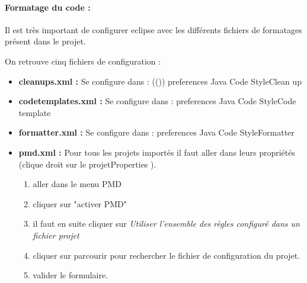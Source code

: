 \paragraph{Formatage du code :}
Il est très important de configurer eclipse avec les différents fichiers de formatages
présent dans le projet. 

On retrouve cinq fichiers de configuration :
\begin{itemize}
	\item  \textbf{cleanups.xml :}  Se configure dans : ((\leftArrow{}))
				  preferences \rightArrow{} Java \rightArrow{}Code Style\rightArrow{}Clean up

	\item \textbf{codetemplates.xml :}  Se configure dans :
				 preferences \rightArrow{}Java \rightArrow{}Code Style\rightArrow{}Code template

	\item \textbf{formatter.xml :} Se configure dans :
				 preferences \rightArrow{} Java \rightArrow{}Code Style\rightArrow{}Formatter

	\item  \textbf{pmd.xml :} Pour tous les projets importés il faut aller dans leurs propriétés  
		(clique droit sur le projet\rightArrow{}Properties ).
		\begin{enumerate}
			\item aller dans le menu PMD
			\item cliquer sur "activer PMD"
			\item il faut en suite cliquer sur \emph{Utiliser l'ensemble des règles configuré dans un fichier projet}
			\item cliquer sur parcourir pour rechercher le fichier de configuration du projet.
			\item valider le formulaire.
		\end{enumerate}



\end{itemize}
